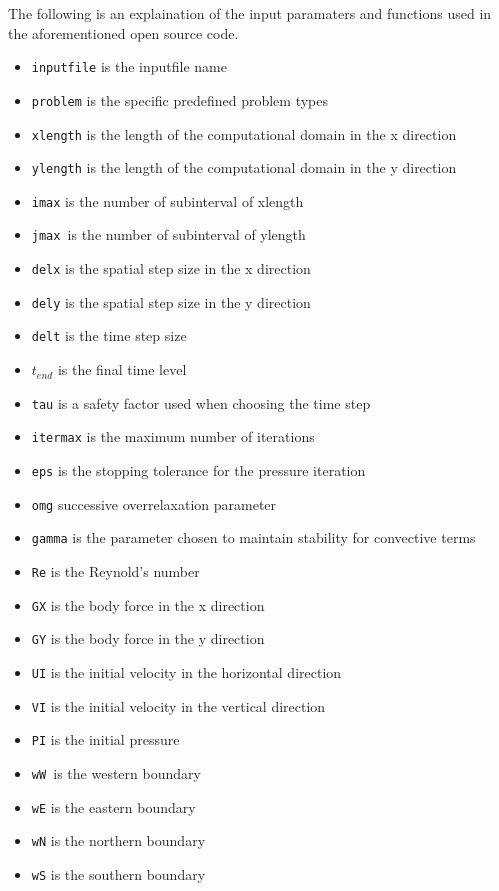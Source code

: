 The following is an explaination of the input paramaters and functions used in the aforementioned open source code.
\begin{itemize}
\item \texttt{inputfile} is the inputfile name
\item \texttt{problem} is the specific predefined problem types
\item \texttt{xlength} is the length of the computational domain in the x direction
\item \texttt{ylength} is the length of the computational domain in the y direction
\item \texttt{imax} is the number of subinterval of xlength
\item \texttt{jmax }is the number of subinterval of ylength
\item \texttt{delx} is the spatial step size in the x direction
\item \texttt{dely} is the spatial step size in the y direction
\item \texttt{delt} is the time step size
\item \texttt{$t_{end}$} is the final time level
\item \texttt{tau} is a safety factor used when choosing the time step
\item \texttt{itermax} is the maximum number of iterations
\item \texttt{eps} is the stopping tolerance for the pressure iteration
\item \texttt{omg} successive overrelaxation parameter
\item \texttt{gamma} is the parameter chosen to maintain stability for convective terms
\item \texttt{Re} is the Reynold's number
\item \texttt{GX} is the body force in the x direction
\item \texttt{GY} is the body force in the y direction
\item \texttt{UI} is the initial velocity in the horizontal direction
\item \texttt{VI} is the initial velocity in the vertical direction
\item \texttt{PI} is the initial pressure
\item \texttt{wW }is the western boundary
\item \texttt{wE} is the eastern boundary
\item \texttt{wN} is the northern boundary
\item \texttt{wS} is the southern boundary
\end{itemize}

